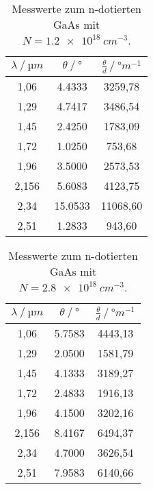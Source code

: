 \begin{table}
  \centering
  \caption{Messwerte zum n-dotierten GaAs mit $N = \SI{1.2e18}{cm^{-3}}$.}
  \label{tab:GaAs1}
  \begin{tabular}{S[table-format=1.3] S[table-format=2.4] S[table-format=5.2]}
    \toprule
    {$\lambda\:/\:\si{µm}$} & {$\theta\:/\:\si{\degree}$} & {$\frac{\theta}{d}\:/\:\si{\degree m^{-1}}$} \\
    ,06  & 4.4333  & 3259,78 \\
    1,29  & 4.7417  & 3486,54 \\
    1,45  & 2.4250  & 1783,09 \\
    1,72  & 1.0250  & 753,68 \\
    1,96  & 3.5000  & 2573,53 \\
    2,156 & 5.6083  & 4123,75 \\
    2,34  & 15.0533 & 11068,60 \\
    2,51  & 1.2833  & 943,60 \\
    \bottomrule
  \end{tabular}
\end{table}

\begin{table}
  \centering
  \caption{Messwerte zum n-dotierten GaAs mit $N = \SI{2.8e18}{cm^{-3}}$.}
  \label{tab:GaAs2}
  \begin{tabular}{S[table-format=1.3] S[table-format=2.4] S[table-format=4.2]}
    \toprule
    {$\lambda\:/\:\si{µm}$} & {$\theta\:/\:\si{\degree}$} & {$\frac{\theta}{d}\:/\:\si{\degree m^{-1}}$} \\
    ,06  & 5.7583 & 4443,13 \\
    1,29  & 2.0500 & 1581,79 \\
    1,45  & 4.1333 & 3189,27 \\
    1,72  & 2.4833 & 1916,13 \\
    1,96  & 4.1500 & 3202,16 \\
    2,156 & 8.4167 & 6494,37 \\
    2,34  & 4.7000 & 3626,54 \\
    2,51  & 7.9583 & 6140,66 \\
    \bottomrule
  \end{tabular}
\end{table}

